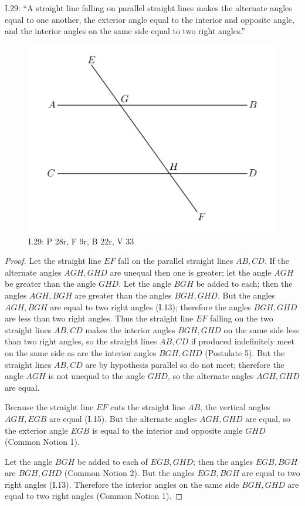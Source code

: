 \documentclass{article}
\begin{document}
I.29: ``A straight line falling on parallel straight lines makes
the alternate angles equal to one another, the exterior angle
equal to the interior and opposite angle, and the interior angles
on the same side equal to two right angles.''

\begin{figure}
\begin{center}
\includegraphics{I29.png}
\end{center}
\caption{I.29: P 28r, F 9r, B 22r, V 33}
\label{I29}
\end{figure}

\begin{proof}
Let the straight line $EF$ fall on the parallel straight lines $AB,CD$. 
If the alternate angles $AGH,GHD$ are unequal then one is greater; let the angle $AGH$ be greater
than the angle $GHD$.
Let the angle $BGH$ be added to each; then the angles $AGH,BGH$ are greater than the
angles $BGH,GHD$. But the angles $AGH,BGH$ are equal to two right angles (I.13); therefore
the angles $BGH,GHD$ are less than two right angles. Thus
the straight line $EF$ falling on the two straight lines $AB,CD$ makes
the interior angles $BGH,GHD$ on the same side less than two right angles, so
the straight lines $AB,CD$ if produced indefinitely meet on 
the same side as are the interior angles $BGH,GHD$ (Postulate 5).
But the straight lines $AB,CD$ are by hypothesis parallel so do not meet;
therefore the angle $AGH$ is not unequal to the angle $GHD$, so the alternate angles
$AGH,GHD$ are equal.

Because the straight line $EF$ cuts the straight line $AB$, 
the vertical angles $AGH,EGB$ are equal (I.15). But the alternate angles
$AGH,GHD$ are equal, so
the exterior angle $EGB$  is equal to the interior and opposite angle $GHD$  (Common Notion 1).

Let the angle $BGH$ be added to each of $EGB,GHD$; then the angles $EGB,BGH$ are 
$BGH,GHD$ (Common Notion 2).
But the angles $EGB,BGH$ are equal to two right angles (I.13).
Therefore the interior angles on the same side $BGH,GHD$ are equal to two right angles (Common Notion 1).
\end{proof}
\end{document}
